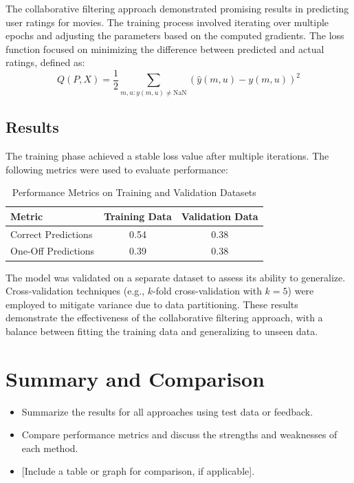 \documentclass[a4paper,9pt]{article}
\begin{document}
The collaborative filtering approach demonstrated promising results in predicting user ratings for movies. The training process involved iterating over multiple epochs and adjusting the parameters based on the computed gradients. The loss function focused on minimizing the difference between predicted and actual ratings, defined as:
\begin{equation}
	Q(P, X) = \frac{1}{2} \sum_{m,u : y(m,u) \neq \text{NaN}} \left( \hat{y}(m,u) - y(m,u) \right)^2 \tag{15}
\end{equation}
\subsection{Results}
The training phase achieved a stable loss value after multiple iterations.
The following metrics were used to evaluate performance:

\begin{table}[h]
	\centering
	\begin{tabular}{|l|c|c|}
		\hline
		\textbf{Metric}     & \textbf{Training Data} & \textbf{Validation Data} \\ \hline
		Correct Predictions & 0.54                   & 0.38                     \\ \hline
		One-Off Predictions & 0.39                   & 0.38                     \\ \hline
	\end{tabular}
	\caption{Performance Metrics on Training and Validation Datasets}
	\label{tab:predictions_metrics}
\end{table}

The model was validated on a separate dataset to assess its ability to generalize.
Cross-validation techniques (e.g., \(k\)-fold cross-validation with \(k=5\)) were employed to mitigate variance due to data partitioning.
These results demonstrate the effectiveness of the collaborative filtering approach, with a balance between
fitting the training data and generalizing to unseen data.

\clearpage
\section{Summary and Comparison}

\begin{itemize}
	\item Summarize the results for all approaches using test data or feedback.
	\item Compare performance metrics and discuss the strengths and weaknesses of each method.
	\item{} [Include a table or graph for comparison, if applicable].
\end{itemize}
\end{document}
